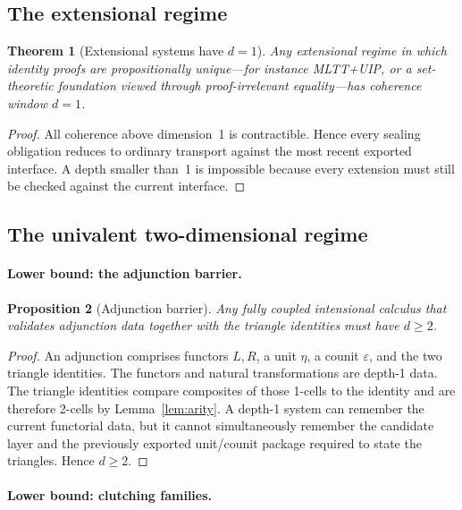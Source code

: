 \documentclass{lmcs}
\theoremstyle{plain}
\newtheorem{thm}{Theorem}[section]
\newtheorem{prop}[thm]{Proposition}
\theoremstyle{definition}
\theoremstyle{remark}
\begin{document}
\subsection{The extensional regime}

\begin{thm}[Extensional systems have $d=1$]
\label{thm:extensional}
Any extensional regime in which identity proofs are propositionally unique---for instance MLTT+UIP, or a set-theoretic foundation viewed through proof-irrelevant equality---has coherence window $d=1$.
\end{thm}

\begin{proof}
All coherence above dimension~1 is contractible.
Hence every sealing obligation reduces to ordinary transport against the most recent exported interface.
A depth smaller than~1 is impossible because every extension must still be checked against the current interface.
\end{proof}

\subsection{The univalent two-dimensional regime}

\paragraph{Lower bound: the adjunction barrier.}

\begin{prop}[Adjunction barrier]
\label{prop:adjunction}
Any fully coupled intensional calculus that validates adjunction data together with the triangle identities must have $d\geq 2$.
\end{prop}

\begin{proof}
An adjunction comprises functors $L,R$, a unit $\eta$, a counit $\varepsilon$, and the two triangle identities.
The functors and natural transformations are depth-1 data.
The triangle identities compare composites of those 1-cells to the identity and are therefore 2-cells by Lemma~\ref{lem:arity}.
A depth-1 system can remember the current functorial data, but it cannot simultaneously remember the candidate layer and the previously exported unit/counit package required to state the triangles.
Hence $d\geq 2$.
\end{proof}

\paragraph{Lower bound: clutching families.}
\end{document}
